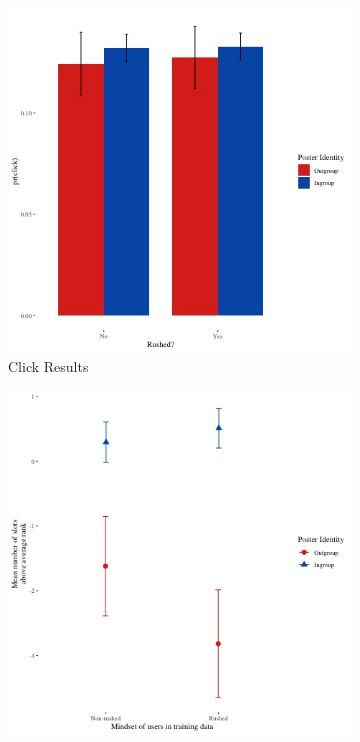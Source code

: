 \documentclass[12pt,letterpaper]{article}
\begin{document}

\begin{figure}[ht]
\caption{Lab Experiment 2 Results}
\label{fig:lab2}
    \begin{subfigure}{.5\textwidth} 
        \centering
       \includegraphics[width=1\linewidth]{Output/Graphs/Experiments/Movie Mechanism/Replication/Lax ingroup click rate.jpg}  
        \caption{Click Results}
        \label{fig:lab2_click}
        \end{subfigure}
    \begin{subfigure}{.5\textwidth}
       \centering
       \includegraphics[width=1\linewidth]{Output/Graphs/Experiments/Movie Mechanism/Replication/Lax ingroup mean algorithm ranking.jpg} 

\end{subfigure}
\end{figure}
\end{document}
